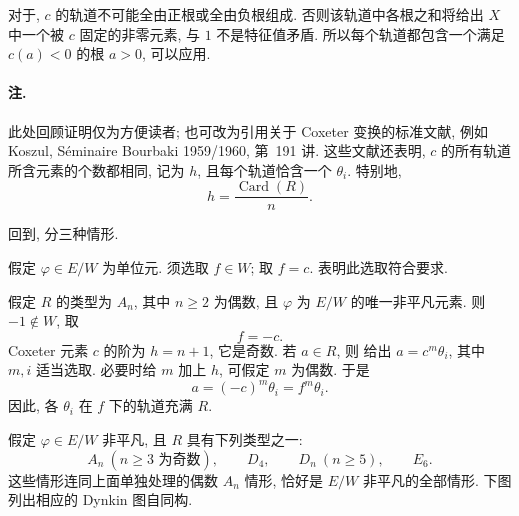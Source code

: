 对于\textup{}, \(c\) 的轨道不可能全由正根或全由负根组成. 否则该轨道中各根之和将给出 \(X\) 中一个被 \(c\) 固定的非零元素, 与 \(1\) 不是特征值矛盾. 所以每个轨道都包含一个满足 \(c(a)<0\) 的根 \(a>0\), 可以应用\textup{}.

\paragraph{\textbf{注.}}
此处回顾证明仅为方便读者; 也可改为引用关于 Coxeter 变换的标准文献, 例如 Koszul, Séminaire Bourbaki 1959/1960, 第~191 讲. 这些文献还表明, \(c\) 的所有轨道所含元素的个数都相同, 记为 \(h\), 且每个轨道恰含一个 \(\theta_i\). 特别地,
\[
  h=\frac{\operatorname{Card}(R)}{n}.
\]

回到, 分三种情形.

\medskip
\noindent\textup{}
假定 \(\varphi\in E/W\) 为单位元. 须选取 \(f\in W\); 取 \(f=c\).  表明此选取符合要求.

\medskip
\noindent\textup{}
假定 \(R\) 的类型为 \(A_n\), 其中 \(n\ge2\) 为偶数, 且 \(\varphi\) 为 \(E/W\) 的唯一非平凡元素. 则 \(-1\notin W\), 取
\[
  f=-c.
\]
Coxeter 元素 \(c\) 的阶为 \(h=n+1\), 它是奇数. 若 \(a\in R\), 则 给出 \(a=c^m\theta_i\), 其中 \(m,i\) 适当选取. 必要时给 \(m\) 加上 \(h\), 可假定 \(m\) 为偶数. 于是
\[
  a=(-c)^m\theta_i=f^m\theta_i.
\]
因此, 各 \(\theta_i\) 在 \(f\) 下的轨道充满 \(R\).



\medskip
\noindent\textup{}
假定 \(\varphi\in E/W\) 非平凡, 且 \(R\) 具有下列类型之一:
\[
  A_n\ (n\ge3\text{ 为奇数}),\qquad
  D_4,\qquad D_n\ (n\ge5),\qquad E_6.
\]
这些情形连同上面单独处理的偶数 \(A_n\) 情形, 恰好是 \(E/W\) 非平凡的全部情形. 下图列出相应的 Dynkin 图自同构.

